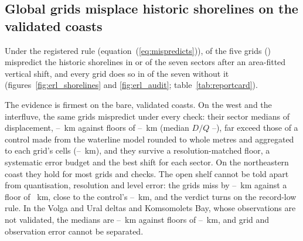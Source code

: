 
\subsection{Global grids misplace historic shorelines on the validated coasts}
Under the registered rule (equation~(\ref{eq:mispredicts})),  of the five grids () mispredict the historic shorelines in  or  of the seven sectors after an area-fitted vertical shift, and every grid does so in  of the seven without it (figures~\ref{fig:erl_shorelines} and \ref{fig:erl_audit}; table~\ref{tab:reportcard}).

The evidence is firmest on the bare, validated coasts. On the west and the interfluve, the same  grids mispredict under every check: their sector medians of displacement, --~km against floors of --~km (median $D/Q$ --), far exceed those of a control made from the waterline model rounded to whole metres and aggregated to each grid's cells (--~km), and they survive a resolution-matched floor, a systematic error budget and the best shift for each sector. On the northeastern coast they hold for most grids and checks. The open shelf cannot be told apart from quantisation, resolution and level error: the grids miss by --~km against a floor of ~km, close to the control's --~km, and the verdict turns on the record-low rule. In the Volga and Ural deltas and Komsomolets Bay, whose observations are not validated, the medians are --~km against floors of --~km, and grid and observation error cannot be separated.

